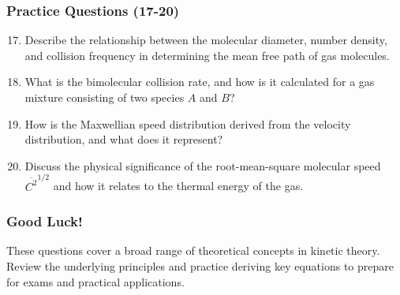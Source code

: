 \documentclass{beamer}
\begin{document}
\begin{frame}
\frametitle{Practice Questions (17-20)}
\begin{enumerate}
    \setcounter{enumi}{16}
    \item Describe the relationship between the molecular diameter, number density, and collision frequency in determining the mean free path of gas molecules.
    \item What is the bimolecular collision rate, and how is it calculated for a gas mixture consisting of two species \( A \) and \( B \)?
    \item How is the Maxwellian speed distribution derived from the velocity distribution, and what does it represent?
    \item Discuss the physical significance of the root-mean-square molecular speed \( \overline{C^2}^{1/2} \) and how it relates to the thermal energy of the gas.
\end{enumerate}
\end{frame}

\begin{frame}
    \frametitle{Good Luck!}
    These questions cover a broad range of theoretical concepts in kinetic theory. Review the underlying principles and practice deriving key equations to prepare for exams and practical applications.
\end{frame}
\end{document}
